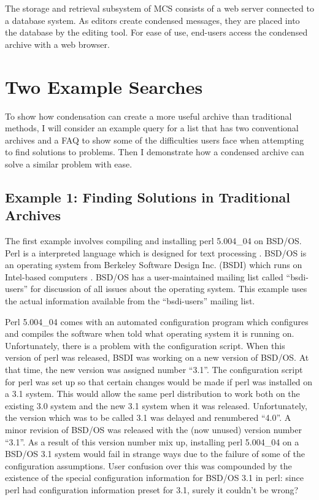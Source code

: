 The storage and retrieval subsystem of MCS consists of a web server connected
to a database system. As editors create condensed messages, they are placed
into the database by the editing tool. For ease of use, end-users access the
condensed archive with a web browser.

\section{Two Example Searches}
\label{sec:examples}
To show how condensation can create a more useful archive than traditional
methods, I will consider an example query for a list that has two conventional
archives and a FAQ to show some of the difficulties users face when attempting
to find solutions to problems. Then I demonstrate how a condensed archive can
solve a similar problem with ease.

\subsection{Example 1: Finding Solutions in Traditional Archives}
The first example involves compiling and installing perl 5.004\_04 on BSD/OS.
Perl is a interpreted language which is designed for text processing
\cite{programming-perl}. BSD/OS is an operating system from Berkeley Software
Design Inc. (BSDI) which runs on Intel-based computers \cite{bsd-os}. BSD/OS
has a user-maintained mailing list called ``bsdi-users'' for discussion of all
issues about the operating system. This example uses the actual information
available from the ``bsdi-users'' mailing list.

Perl 5.004\_04 comes with an automated configuration program which configures
and compiles the software when told what operating system it is running on.
Unfortunately, there is a problem with the configuration script. When this
version of perl was released, BSDI was working on a new version of BSD/OS. At
that time, the new version was assigned number ``3.1''. The configuration
script for perl was set up so that certain changes would be made if perl was
installed on a 3.1 system. This would allow the same perl distribution to work
both on the existing 3.0 system and the new 3.1 system when it was released.
Unfortunately, the version which was to be called 3.1 was delayed and
renumbered ``4.0''. A minor revision of BSD/OS was released with the (now
unused) version number ``3.1''. As a result of this version number mix up,
installing perl 5.004\_04 on a BSD/OS 3.1 system would fail in strange ways due
to the failure of some of the configuration assumptions. User confusion over
this was compounded by the existence of the special configuration information
for BSD/OS 3.1 in perl: since perl had configuration information preset for
3.1, surely it couldn't be wrong?


